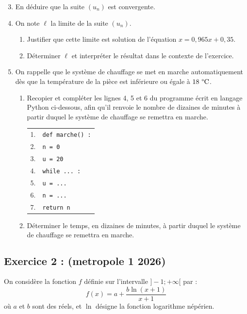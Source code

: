 \documentclass[12pt,a4paper]{article}
\begin{document}
\begin{enumerate}
    \setcounter{enumi}{2}
    \item En déduire que la suite $(u_n)$ est convergente.
    \item On note $\ell$ la limite de la suite $(u_n)$.
    \begin{enumerate}
        \item Justifier que cette limite est solution de l'équation $x = 0,965x + 0,35$.
        \item Déterminer $\ell$ et interpréter le résultat dans le contexte de l'exercice.
    \end{enumerate}
    \item On rappelle que le système de chauffage se met en marche automatiquement dès que la température de la pièce est inférieure ou égale à $18\text{ \textdegree{}C}$.
    \begin{enumerate}
        \item Recopier et compléter les lignes 4, 5 et 6 du programme écrit en langage Python ci-dessous, afin qu'il renvoie le nombre de dizaines de minutes à partir duquel le système de chauffage se remettra en marche.
        
        \begin{center}
        \begin{tabular}{|l l|}
            \hline
            1. & \texttt{def marche() :} \\
            2. & \quad \texttt{n = 0} \\
            3. & \quad \texttt{u = 20} \\
            4. & \quad \texttt{while ... :} \\
            5. & \quad \quad \texttt{u = ...} \\
            6. & \quad \quad \texttt{n = ...} \\
            7. & \quad \texttt{return n} \\
            \hline
        \end{tabular}
        \end{center}
        
        \item Déterminer le temps, en dizaines de minutes, à partir duquel le système de chauffage se remettra en marche.
    \end{enumerate}
\end{enumerate}

\subsection*{Exercice 2 : (metropole 1 2026)}
On considère la fonction $f$ définie sur l'intervalle $]-1 ; +\infty[$ par :
$$f(x) = a + \frac{b\ln(x+1)}{x+1}$$
où $a$ et $b$ sont des réels, et $\ln$ désigne la fonction logarithme népérien.
\end{document}

